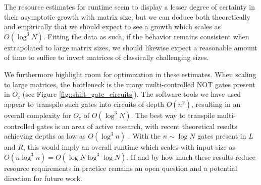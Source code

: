 \documentclass[10pt, twocolumn]{article}
\begin{document}
The resource estimates for runtime seem to display a lesser degree of certainty in their asymptotic growth with matrix size, but we can deduce both theoretically and empirically that we should expect to see a growth which scales as $O(\log^3{N})$. Fitting the data as such, if the behavior remains consistent when extrapolated to large matrix sizes, we should likewise expect a reasonable amount of time to suffice to invert matrices of classically challenging sizes.

We furthermore highlight room for optimization in these estimates. When scaling to large matrices, the bottleneck is the many multi-controlled \textsc{NOT} gates present in $O_c$ (see Figure \ref{fig::shift_gate_circuits}). The software tools we have used appear to transpile such gates into circuits of depth $O(n^2)$, resulting in an overall complexity for $O_c$ of $O(\log^3{N})$. The best way to transpile multi-controlled gates is an area of active research, with recent theoretical results achieving depths as low as $O(\log^3{n})$ \cite{claudon2024polylogarithmic}. With the $n \sim \log{N}$ gates present in $L$ and $R$, this would imply an overall runtime which scales with input size as $O(n \log^3{n}) = O(\log{N} \log^3{\log{N}} )$. If and by how much these results reduce resource requirements in practice remains an open question and a potential direction for future work.

\printbibliography
\end{document}
